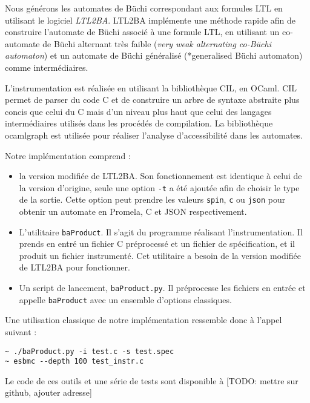 Nous générons les automates de Büchi correspondant aux formules LTL en
utilisant le logiciel \emph{LTL2BA}\cite{ltl2ba}. LTL2BA implémente
une méthode rapide afin de construire l'automate de Büchi associé à une
formule LTL, en utilisant un co-automate de Büchi alternant très faible
(\emph{very weak alternating co-Büchi automaton}) et un automate de
Büchi généralisé (*generalised Büchi automaton) comme intermédiaires.

L'instrumentation est réalisée en utilisant la bibliothèque
CIL\cite{cil}, en OCaml\cite{ocamlrefman}. CIL permet de parser
du code C et de construire un arbre de syntaxe abstraite plus concis que
celui du C mais d'un niveau plus haut que celui des langages
intermédiaires utilisés dans les procédés de compilation. La
bibliothèque ocamlgraph\cite{ocamlgraph} est utilisée pour réaliser
l'analyse d'accessibilité dans les automates.

Notre implémentation comprend :

\begin{itemize}
\item
  la version modifiée de LTL2BA. Son fonctionnement est identique à
  celui de la version d'origine, seule une option \texttt{-t} a été
  ajoutée afin de choisir le type de la sortie. Cette option peut
  prendre les valeurs \texttt{spin}, \texttt{c} ou
  \texttt{json} pour obtenir un automate en Promela, C et JSON
  respectivement.
\item
  L'utilitaire \texttt{baProduct}. Il s'agit du programme réalisant
  l'instrumentation. Il prends en entré un fichier C préprocessé et un
  fichier de spécification, et il produit un fichier instrumenté. Cet
  utilitaire a besoin de la version modifiée de LTL2BA pour fonctionner.
\item
  Un script de lancement, \texttt{baProduct.py}. Il préprocesse les
  fichiers en entrée et appelle \texttt{baProduct} avec un ensemble
  d'options classiques.
\end{itemize}

Une utilisation classique de notre implémentation ressemble donc à
l'appel suivant :

\begin{lstlisting}
~ ./baProduct.py -i test.c -s test.spec
~ esbmc --depth 100 test_instr.c
\end{lstlisting}

Le code de ces outils et une série de tests sont disponible à {[}TODO:
mettre sur github, ajouter adresse{]}
